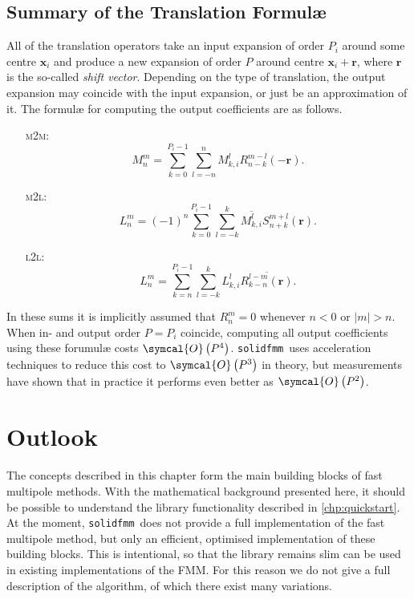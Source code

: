 \documentclass{scrbook}
\newcommand{\solidfmm}{\texttt{solidfmm}}
\newcommand{\MtoM}{\textsc{m2m}}
\newcommand{\MtoL}{\textsc{m2l}}
\newcommand{\LtoL}{\textsc{l2l}}
\newcommand{\vv}[1]{\ensuremath{\symbf{#1}}} %
\newcommand{\bigO}[1]{\ensuremath{\symcal{O}\left({#1}\right)}}
\begin{document}
\subsection{Summary of the Translation Formulæ}\label{sec:translationsummary}
All of the translation operators take an input expansion of order $P_i$ around
some centre $\vv{x}_i$ and produce a new expansion of order $P$ around centre
$\vv{x}_i+\vv{r}$, where $\vv{r}$ is the so-called \emph{shift vector}.
Depending on the type of translation, the output expansion may coincide with
the input expansion, or just be an approximation of it. The formulæ for
computing the output coefficients are as follows.
\begin{itemize}
\item[\MtoM:]
\begin{equation}
M_n^m = \sum_{k=0}^{P_i-1} \sum_{l=-n}^{n}
M_{k,i}^lR_{n-k}^{m-l}(-\vv{r}).
\end{equation}
\item[\MtoL:]
\begin{equation}
L_n^m = (-1)^n
\sum_{k=0}^{P_i-1}\sum_{l=-k}^{k}
\overline{M_{k,i}^l}S_{n+k}^{m+l}(\vv{r}).
\end{equation}
\item[\LtoL:]
\begin{equation}
L_n^m = \sum_{k=n}^{P_i-1}\sum_{l=-k}^k
L_{k,i}^l\overline{R_{k-n}^{l-m}(\vv{r})}.
\end{equation}
\end{itemize}
In these sums it is implicitly assumed that $R_n^m=0$ whenever $n<0$ or
$|m| > n$. When in- and output order $P=P_i$ coincide, computing all output
coefficients using these forumulæ costs \bigO{P^4}. \solidfmm\ uses acceleration
techniques to reduce this cost to \bigO{P^3} in theory, but measurements have
shown that in practice it performs even better as \bigO{P^2}.

\section{Outlook}
The concepts described in this chapter form the main building blocks of
fast multipole methods. With the mathematical background presented here, it
should be possible to understand the library functionality described in
\cref{chp:quickstart}. At the moment, \solidfmm\ does not provide a full
implementation of the fast multipole method, but only an efficient, optimised
implementation of these building blocks. This is intentional, so that the
library remains slim can be used in existing implementations of the FMM. For
this reason we do not give a full description of the algorithm, of which there
exist many variations.
\end{document}
